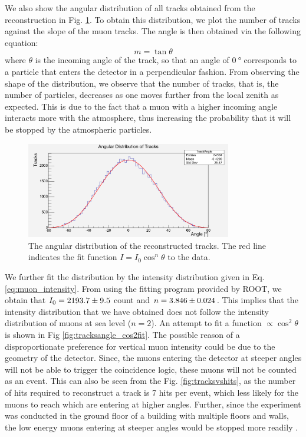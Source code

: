\documentclass[a4paper]{report}
\numberwithin{equation}{section}
\begin{document}
We also show the angular distribution of all tracks obtained from the reconstruction in Fig. \ref{fig:tracksangle}. To obtain this distribution, we 
plot the number of tracks against the slope of the muon tracks. The angle is then obtained via the following equation:
\begin{equation}
	m = \tan \theta
\end{equation}
where $\theta$ is the incoming angle of the track, so that an angle of $\SI{0}{\degree}$ corresponds to a particle that enters the 
detector in a perpendicular fashion. From observing the shape of the distribution, we observe that the number of tracks, that is, 
the number of particles, decreases as one moves further from the local zenith as expected. This is due to the fact that a muon with a 
higher incoming angle interacts more with the atmosphere, thus increasing the probability that it will be stopped by the atmospheric
particles. \par 

\begin{figure}[!h]
	\centering
	\includegraphics[width=0.8\textwidth]{trackangle.png}
	\caption{The angular distribution of the reconstructed tracks. The red line indicates the fit function $I = I_0 \cos^n \theta$
			to the data. }
	\label{fig:tracksangle}
\end{figure}


We further fit the distribution by the intensity distribution given in Eq. \ref{eq:muon_intensity}. From using the fitting 
program provided by ROOT, we obtain that $I_0 = \num{2193.7 \pm 9.5}$ count and $n = \num{3.846 \pm 0.024}$. This implies that 
the intensity distribution that we have obtained does not follow the intensity distribution of muons at sea level ($n = 2$). 
An attempt to fit a function $\propto \cos ^2 \theta$ is shown in Fig \ref{fig:tracksangle_cos2fit}. The possible reason of a disproportionate preference for vertical muon intensity could be due to the geometry of the detector. Since, the muons entering the detector at steeper angles will not be able to trigger the coincidence logic, these muons will not be counted as an event. This can also be seen from the Fig. \ref{fig:tracksvshits}, as the number of hits required to reconstruct a track is 7 hits per event, which less likely for the muons to reach which are entering at higher angles. Further, since the experiment was conducted in the ground floor of a building with multiple floors and walls, the low energy muons entering at steeper angles would be stopped more readily \cite{OlmosYanez:2019yqv}. 
\end{document}
